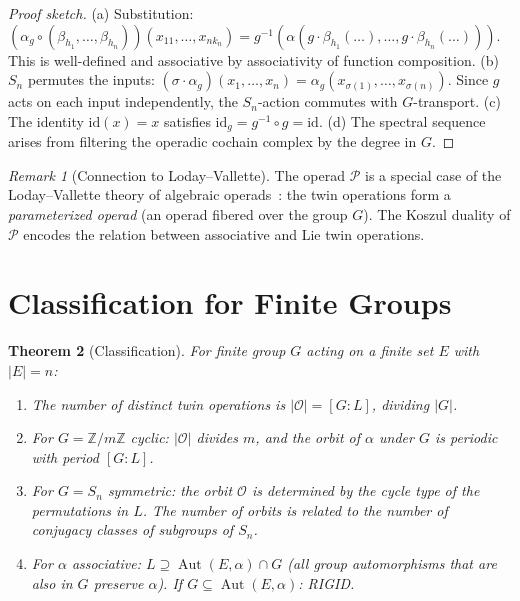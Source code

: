 \documentclass[11pt,twocolumn]{article}
\theoremstyle{plain}\newtheorem{theorem}{Theorem}\newtheorem{proposition}[theorem]{Proposition}\newtheorem{corollary}[theorem]{Corollary}\newtheorem{lemma}[theorem]{Lemma}
\theoremstyle{definition}\newtheorem{definition}[theorem]{Definition}\newtheorem{example}[theorem]{Example}
\theoremstyle{remark}\newtheorem{remark}[theorem]{Remark}
\newcommand{\Aut}{\operatorname{Aut}}
\begin{document}
\begin{proof}[Proof sketch]
(a) Substitution: $(\alpha_g \circ (\beta_{h_1}, \ldots, \beta_{h_n}))(x_{11}, \ldots, x_{nk_n}) = g^{-1}(\alpha(g \cdot \beta_{h_1}(\ldots), \ldots, g \cdot \beta_{h_n}(\ldots)))$. This is well-defined and associative by associativity of function composition.
(b) $S_n$ permutes the inputs: $(\sigma \cdot \alpha_g)(x_1, \ldots, x_n) = \alpha_g(x_{\sigma(1)}, \ldots, x_{\sigma(n)})$. Since $g$ acts on each input independently, the $S_n$-action commutes with $G$-transport.
(c) The identity $\mathrm{id}(x) = x$ satisfies $\mathrm{id}_g = g^{-1} \circ g = \mathrm{id}$.
(d) The spectral sequence arises from filtering the operadic cochain complex by the degree in $G$.
\end{proof}

\begin{remark}[Connection to Loday--Vallette]
The operad $\mathcal{P}$ is a special case of the Loday--Vallette theory of algebraic operads~\cite{loday2012}: the twin operations form a \emph{parameterized operad} (an operad fibered over the group $G$). The Koszul duality of $\mathcal{P}$ encodes the relation between associative and Lie twin operations.
\end{remark}


\section{Classification for Finite Groups}
\label{sec:classification}

\begin{theorem}[Classification]\label{thm:classification}
For finite group $G$ acting on a finite set $E$ with $|E| = n$:
\begin{enumerate}[label=(\alph*)]
    \item The number of distinct twin operations is $|\mathcal{O}| = [G:L]$, dividing $|G|$.
    \item For $G = \mathbb{Z}/m\mathbb{Z}$ cyclic: $|\mathcal{O}|$ divides $m$, and the orbit of $\alpha$ under $G$ is periodic with period $[G:L]$.
    \item For $G = S_n$ symmetric: the orbit $\mathcal{O}$ is determined by the cycle type of the permutations in $L$. The number of orbits is related to the number of conjugacy classes of subgroups of $S_n$.
    \item For $\alpha$ associative: $L \supseteq \Aut(E, \alpha) \cap G$ (all group automorphisms that are also in $G$ preserve $\alpha$). If $G \subseteq \Aut(E, \alpha)$: RIGID.
\end{enumerate}
\end{theorem}
\end{document}
